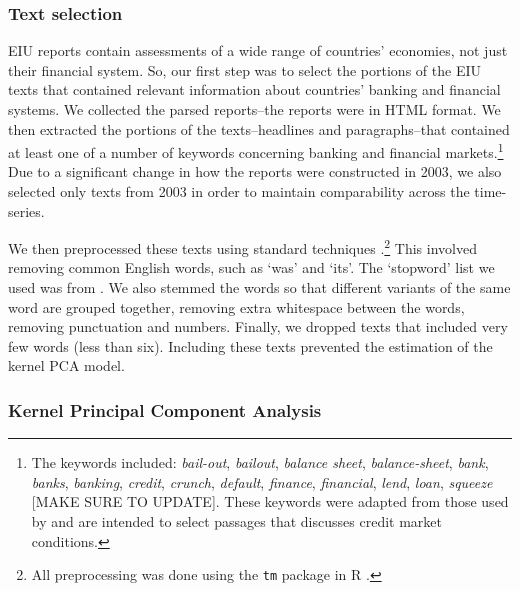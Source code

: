 \documentclass[]{article}
\begin{document}
\subsubsection{Text selection}\label{text-selection}

EIU reports contain assessments of a wide range of countries' economies,
not just their financial system. So, our first step was to select the
portions of the EIU texts that contained relevant information about
countries' banking and financial systems. We collected the parsed
reports--the reports were in HTML format. We then extracted the portions
of the texts--headlines and paragraphs--that contained at least one of a
number of keywords concerning banking and financial markets.\footnote{The
  keywords included: \emph{bail-out}, \emph{bailout}, \emph{balance
  sheet}, \emph{balance-sheet}, \emph{bank}, \emph{banks},
  \emph{banking}, \emph{credit}, \emph{crunch}, \emph{default},
  \emph{finance}, \emph{financial}, \emph{lend}, \emph{loan},
  \emph{squeeze} {[}MAKE SURE TO UPDATE{]}. These keywords were adapted
  from those used by \cite{Romer2015} and are intended to
  select passages that discusses credit market conditions.} Due to a
significant change in how the reports were constructed in 2003, we also
selected only texts from 2003 in order to maintain comparability across
the time-series.

We then preprocessed these texts using standard techniques \citep[see][]{Grimmer2013}.\footnote{All preprocessing was done using the
  \texttt{tm} package \citep{tm2015} in R \citep{R-cite}.} This involved removing common English words, such as `was' and `its'. The `stopword' list we used was from \cite{dhillon:modha:mlj01}. We also stemmed the words so that different variants of the same word are grouped together, removing extra whitespace between the words, removing punctuation and numbers. Finally, we dropped texts that included very few words (less than six). Including these texts prevented
the estimation of the kernel PCA model.

\subsubsection{Kernel Principal Component
Analysis}\label{kernel-principal-component-analysis}
\end{document}
